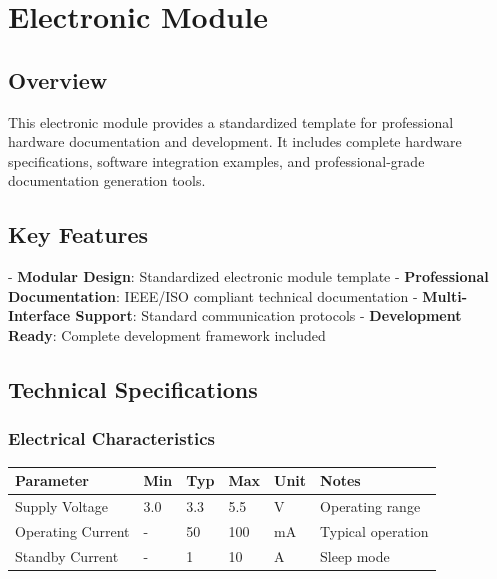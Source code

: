 \documentclass[11pt,a4paper]{article}
\begin{document}
\tableofcontents
\newpage



\setcounter{section}{0}
\section{Electronic Module}


\subsection{Overview}

This electronic module provides a standardized template for professional hardware documentation and development. It includes complete hardware specifications, software integration examples, and professional-grade documentation generation tools.

\subsection{Key Features}

- \textbf{Modular Design}: Standardized electronic module template
- \textbf{Professional Documentation}: IEEE/ISO compliant technical documentation
- \textbf{Multi-Interface Support}: Standard communication protocols
- \textbf{Development Ready}: Complete development framework included

\subsection{Technical Specifications}

\subsubsection{Electrical Characteristics}

\begin{table}[H]
\centering
\begin{tabular}{llllll}
\toprule
Parameter & Min & Typ & Max & Unit & Notes \\
\midrule
Supply Voltage & 3.0 & 3.3 & 5.5 & V & Operating range \\
Operating Current & - & 50 & 100 & mA & Typical operation \\
Standby Current & - & 1 & 10 & \textmu{}A & Sleep mode \\
\bottomrule
\end{tabular}
\end{table}
\end{document}
